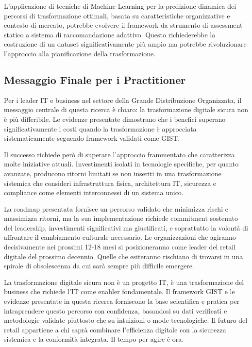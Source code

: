 L'applicazione di tecniche di Machine Learning per la predizione dinamica dei percorsi di trasformazione ottimali, basata su caratteristiche organizzative e contesto di mercato, potrebbe evolvere il framework da strumento di assessment statico a sistema di raccomandazione adattivo. Questo richiederebbe la costruzione di un dataset significativamente più ampio ma potrebbe rivoluzionare l'approccio alla pianificazione della trasformazione.

\subsection{Messaggio Finale per i Practitioner}

Per i leader IT e business nel settore della Grande Distribuzione Organizzata, il messaggio centrale di questa ricerca è chiaro: la trasformazione digitale sicura non è più differibile. Le evidenze presentate dimostrano che i benefici superano significativamente i costi quando la trasformazione è approcciata sistematicamente seguendo framework validati come GIST.

Il successo richiede però di superare l'approccio frammentato che caratterizza molte iniziative attuali. Investimenti isolati in tecnologie specifiche, per quanto avanzate, producono ritorni limitati se non inseriti in una trasformazione sistemica che consideri infrastruttura fisica, architettura IT, sicurezza e compliance come elementi interconnessi di un sistema unico.

La roadmap presentata fornisce un percorso validato che minimizza rischi e massimizza ritorni, ma la sua implementazione richiede commitment sostenuto del leadership, investimenti significativi ma giustificati, e soprattutto la volontà di affrontare il cambiamento culturale necessario. Le organizzazioni che agiranno decisivamente nei prossimi 12-18 mesi si posizioneranno come leader del retail digitale del prossimo decennio. Quelle che esiteranno rischiano di trovarsi in una spirale di obsolescenza da cui sarà sempre più difficile emergere.

La trasformazione digitale sicura non è un progetto IT, è una trasformazione del business che richiede l'IT come enabler fondamentale. Il framework GIST e le evidenze presentate in questa ricerca forniscono la base scientifica e pratica per intraprendere questo percorso con confidenza, basandosi su dati verificati e metodologie validate piuttosto che su intuizioni o mode tecnologiche. Il futuro del retail appartiene a chi saprà combinare l'efficienza digitale con la sicurezza sistemica e la conformità integrata. Il tempo per agire è ora.


% 
% 
